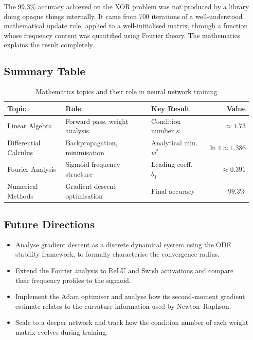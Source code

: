 \documentclass[12pt,a4paper]{article}
\begin{document}
The 99.3\% accuracy achieved on the XOR problem was not produced by a library doing opaque things internally. It came from 700 iterations of a well-understood mathematical update rule, applied to a well-initialised matrix, through a function whose frequency content was quantified using Fourier theory. The mathematics explains the result completely.

\subsection{Summary Table}

\begin{table}[H]
  \centering
  \caption{Mathematics topics and their role in neural network training}
  \renewcommand{\arraystretch}{1.3}
  \begin{tabular}{p{3.2cm} p{4.2cm} p{3.2cm} r}
    \toprule
    \textbf{Topic} & \textbf{Role} & \textbf{Key Result} & \textbf{Value} \\
    \midrule
    Linear Algebra        & Forward pass, weight analysis      & Condition number $\kappa$ & $\approx 1.73$ \\
    Differential Calculus & Backpropagation, minimisation      & Analytical min.\ $w^*$    & $\ln 4 \approx 1.386$ \\
    Fourier Analysis      & Sigmoid frequency structure        & Leading coeff.\ $b_1$     & $\approx 0.391$ \\
    Numerical Methods     & Gradient descent optimisation      & Final accuracy            & $99.3\%$ \\
    \bottomrule
  \end{tabular}
  \label{tab:summary}
\end{table}

\subsection{Future Directions}

\begin{itemize}[leftmargin=2em, itemsep=4pt]
  \item Analyse gradient descent as a discrete dynamical system using the ODE stability framework, to formally characterise the convergence radius.
  \item Extend the Fourier analysis to ReLU and Swish activations and compare their frequency profiles to the sigmoid.
  \item Implement the Adam optimiser and analyse how its second-moment gradient estimate relates to the curvature information used by Newton--Raphson.
  \item Scale to a deeper network and track how the condition number of each weight matrix evolves during training.
\end{itemize}
\end{document}
